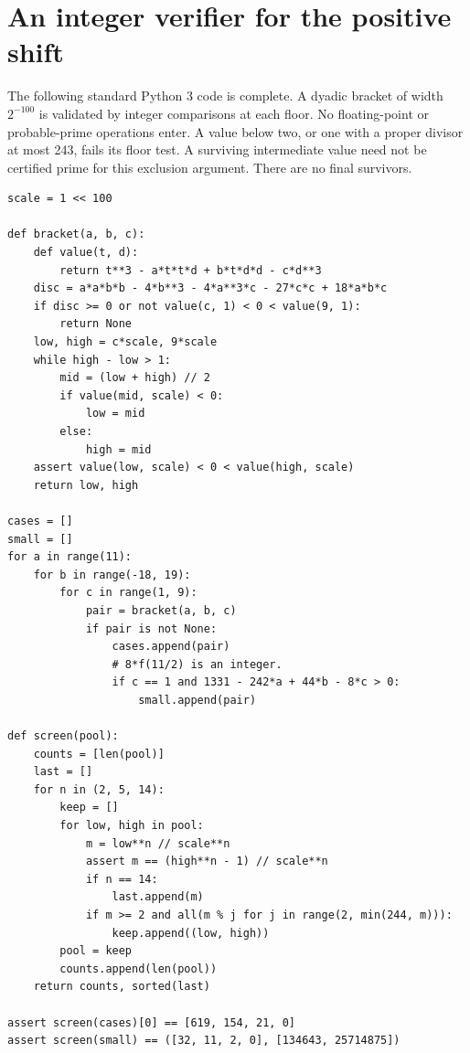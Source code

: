\documentclass[11pt]{article}
\begin{document}
\appendix
\section{An integer verifier for the positive shift}
The following standard Python 3 code is complete. A dyadic bracket of width $2^{-100}$ is validated by integer comparisons at each floor. No floating-point or probable-prime operations enter. A value below two, or one with a proper divisor at most 243, fails its floor test. A surviving intermediate value need not be certified prime for this exclusion argument. There are no final survivors.
\begingroup\small
\begin{verbatim}
scale = 1 << 100

def bracket(a, b, c):
    def value(t, d):
        return t**3 - a*t*t*d + b*t*d*d - c*d**3
    disc = a*a*b*b - 4*b**3 - 4*a**3*c - 27*c*c + 18*a*b*c
    if disc >= 0 or not value(c, 1) < 0 < value(9, 1):
        return None
    low, high = c*scale, 9*scale
    while high - low > 1:
        mid = (low + high) // 2
        if value(mid, scale) < 0:
            low = mid
        else:
            high = mid
    assert value(low, scale) < 0 < value(high, scale)
    return low, high

cases = []
small = []
for a in range(11):
    for b in range(-18, 19):
        for c in range(1, 9):
            pair = bracket(a, b, c)
            if pair is not None:
                cases.append(pair)
                # 8*f(11/2) is an integer.
                if c == 1 and 1331 - 242*a + 44*b - 8*c > 0:
                    small.append(pair)

def screen(pool):
    counts = [len(pool)]
    last = []
    for n in (2, 5, 14):
        keep = []
        for low, high in pool:
            m = low**n // scale**n
            assert m == (high**n - 1) // scale**n
            if n == 14:
                last.append(m)
            if m >= 2 and all(m % j for j in range(2, min(244, m))):
                keep.append((low, high))
        pool = keep
        counts.append(len(pool))
    return counts, sorted(last)

assert screen(cases)[0] == [619, 154, 21, 0]
assert screen(small) == ([32, 11, 2, 0], [134643, 25714875])
\end{verbatim}
\endgroup
\end{document}
